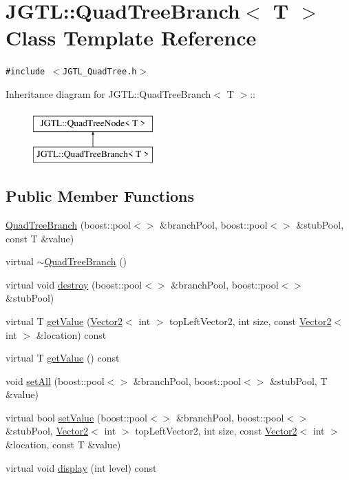 \hypertarget{class_j_g_t_l_1_1_quad_tree_branch}{
\section{JGTL::Quad\-Tree\-Branch$<$ T $>$ Class Template Reference}
\label{class_j_g_t_l_1_1_quad_tree_branch}
}
{\tt \#include $<$JGTL\_\-Quad\-Tree.h$>$}

Inheritance diagram for JGTL::Quad\-Tree\-Branch$<$ T $>$::\begin{figure}[H]
\begin{center}
\leavevmode
\includegraphics[height=2cm]{class_j_g_t_l_1_1_quad_tree_branch}
\end{center}
\end{figure}
\subsection*{Public Member Functions}
\begin{CompactItemize}
\item 
\hyperlink{class_j_g_t_l_1_1_quad_tree_branch_621e0d6cca450c0dabc2f5e60310ac0c}{Quad\-Tree\-Branch} (boost::pool$<$$>$ \&branch\-Pool, boost::pool$<$$>$ \&stub\-Pool, const T \&value)
\item 
virtual \hyperlink{class_j_g_t_l_1_1_quad_tree_branch_57c133b54176b9b48bfab059cd194cb2}{$\sim$Quad\-Tree\-Branch} ()
\item 
virtual void \hyperlink{class_j_g_t_l_1_1_quad_tree_branch_ee97ca947b60a3cd9374f8decd1392d8}{destroy} (boost::pool$<$$>$ \&branch\-Pool, boost::pool$<$$>$ \&stub\-Pool)
\item 
virtual T \hyperlink{class_j_g_t_l_1_1_quad_tree_branch_4354d8a11f9092f3f189f0eef4d2ffff}{get\-Value} (\hyperlink{class_j_g_t_l_1_1_vector2}{Vector2}$<$ int $>$ top\-Left\-Vector2, int size, const \hyperlink{class_j_g_t_l_1_1_vector2}{Vector2}$<$ int $>$ \&location) const 
\item 
virtual T \hyperlink{class_j_g_t_l_1_1_quad_tree_branch_131c37ee0dc66949927c62f9b438816d}{get\-Value} () const
\item 
void \hyperlink{class_j_g_t_l_1_1_quad_tree_branch_6c81dbe713996cf7ff82e8b093ede81e}{set\-All} (boost::pool$<$$>$ \&branch\-Pool, boost::pool$<$$>$ \&stub\-Pool, T \&value)
\item 
virtual bool \hyperlink{class_j_g_t_l_1_1_quad_tree_branch_82dcced1ba01d374ce25b8d67b27302c}{set\-Value} (boost::pool$<$$>$ \&branch\-Pool, boost::pool$<$$>$ \&stub\-Pool, \hyperlink{class_j_g_t_l_1_1_vector2}{Vector2}$<$ int $>$ top\-Left\-Vector2, int size, const \hyperlink{class_j_g_t_l_1_1_vector2}{Vector2}$<$ int $>$ \&location, const T \&value)
\item 
virtual void \hyperlink{class_j_g_t_l_1_1_quad_tree_branch_1a9cb0c814af012ad2a1a891b7223179}{display} (int level) const
\end{CompactItemize}
